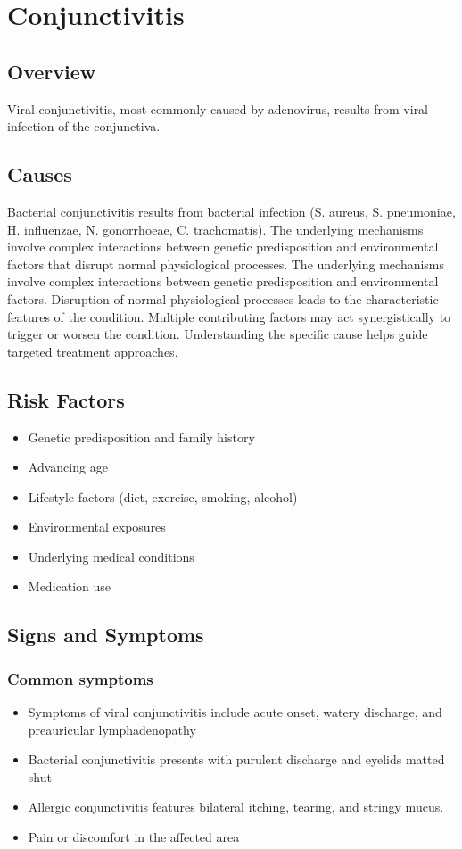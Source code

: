 \chapter{Conjunctivitis}
\label{sec:Conjunctivitis}

\section{Overview}
Viral conjunctivitis, most commonly caused by adenovirus, results from viral infection of the conjunctiva.
\section{Causes}
Bacterial conjunctivitis results from bacterial infection (S. aureus, S. pneumoniae, H. influenzae, N. gonorrhoeae, C. trachomatis). The underlying mechanisms involve complex interactions between genetic predisposition and environmental factors that disrupt normal physiological processes. The underlying mechanisms involve complex interactions between genetic predisposition and environmental factors. Disruption of normal physiological processes leads to the characteristic features of the condition. Multiple contributing factors may act synergistically to trigger or worsen the condition. Understanding the specific cause helps guide targeted treatment approaches.
\section{Risk Factors}


\begin{itemize}[noitemsep]
  \item Genetic predisposition and family history
  \item Advancing age
  \item Lifestyle factors (diet, exercise, smoking, alcohol)
  \item Environmental exposures
  \item Underlying medical conditions
  \item Medication use
\end{itemize}
\section{Signs and Symptoms}

\subsection{Common symptoms}
\begin{itemize}[noitemsep]
  \item Symptoms of viral conjunctivitis include acute onset, watery discharge, and preauricular lymphadenopathy
  \item Bacterial conjunctivitis presents with purulent discharge and eyelids matted shut
  \item Allergic conjunctivitis features bilateral itching, tearing, and stringy mucus.
  \item Pain or discomfort in the affected area
  \end{itemize}

